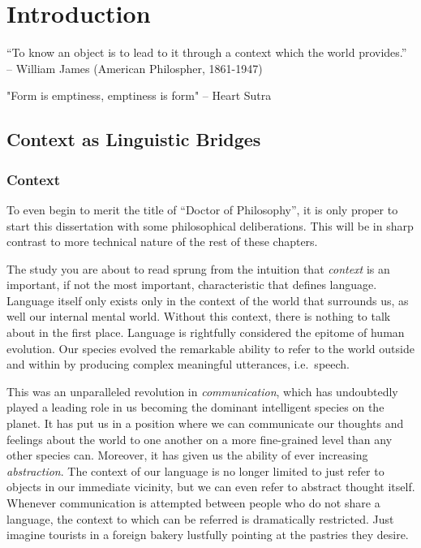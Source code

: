 \chapter{Introduction}

“To know an object is to lead to it through a context which the world provides.” -- William James (American Philospher, 1861-1947)

"Form is emptiness, emptiness is form" -- Heart Sutra

\section{Context as Linguistic Bridges}

\subsection{Context}

To even begin to merit the title of ``Doctor of Philosophy'', it is only proper
to start this dissertation with some philosophical deliberations. This will be
in sharp contrast to more technical nature of the rest of these chapters.

The study you are about to read sprung from the intuition that \emph{context}
is an important, if not the most important, characteristic that defines
language. Language itself only exists only in the context of the world that
surrounds us, as well our internal mental world. Without this context, there is
nothing to talk about in the first place. Language is rightfully considered the
epitome of human evolution. Our species evolved the remarkable ability to refer
to the world outside and within by producing complex meaningful utterances,
i.e.\ speech. 


This was an unparalleled revolution in \emph{communication}, which has
undoubtedly played a leading role in us becoming the dominant intelligent
species on the planet. It has put us in a position where we can communicate our
thoughts and feelings about the world to one another on a more fine-grained
level than any other species can. Moreover, it has given us the ability of ever
increasing \emph{abstraction}. The context of our language is no longer limited
to just refer to objects in our immediate vicinity, but we can even refer to
abstract thought itself. Whenever communication is attempted between people who
do not share a language, the context to which can be referred is dramatically
restricted.  Just imagine tourists in a foreign bakery lustfully pointing at
the pastries they desire. 

